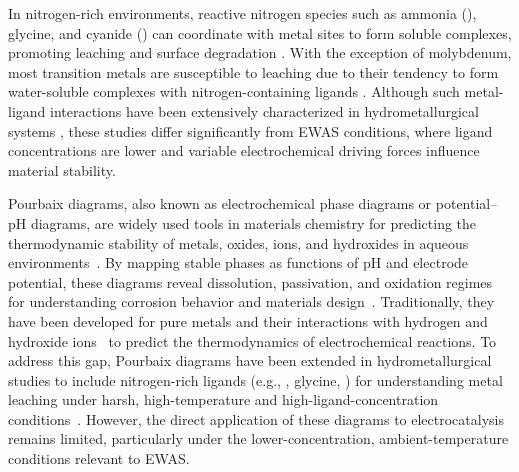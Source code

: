 \documentclass[journal=jacsat,manuscript=article]{achemso}
\begin{document}
In nitrogen-rich environments, reactive nitrogen species such as ammonia (), glycine, and cyanide () can coordinate with metal sites to form soluble complexes, promoting leaching and surface degradation \cite{Bjerrum1957StabilitySubstances, Meng1996PrinciplesReview, Wang2022AmmoniaSystem}. With the exception of molybdenum, most transition metals are susceptible to leaching due to their tendency to form water-soluble complexes with nitrogen-containing ligands \cite{Meng1996PrinciplesReview, Ma2021ALeaching, Wang2020Reduction-ammoniacalSalts, Li2025Glycine-mediatedStudy}. Although such metal-ligand interactions have been extensively characterized in hydrometallurgical systems \cite{Han1974AMMONIA-AMMONIUMNODULES, Bhuntumkomol1982TheSolutions, Azadi2021SustainableGlycine, Oraby2020GoldPermanganate, Sarvar2023ApplicationStructure, SPARROW1995CyanideApplications, Akcil2015PreciousReview, Wang2022AmmoniaSystem, Ma2021ALeaching, Wang2020Reduction-ammoniacalSalts, Li2025Glycine-mediatedStudy}, these studies differ significantly from EWAS conditions, where ligand concentrations are lower and variable electrochemical driving forces influence material stability.


Pourbaix diagrams, also known as electrochemical phase diagrams or potential–pH diagrams, are widely used tools in materials chemistry for predicting the thermodynamic stability of metals, oxides, ions, and hydroxides in aqueous environments~\cite{PourbaixAtlasSolutions, Huang2015ElectrochemicalCalculations, McCafferty2010ThermodynamicsDiagrams}. By mapping stable phases as functions of pH and electrode potential, these diagrams reveal dissolution, passivation, and oxidation regimes for understanding corrosion behavior and materials design~\cite{Stack2005BridgingDiagrams, Pourbaix1973LecturesCorrosion, Fontana1987CorrosionCompany}. Traditionally, they have been developed for pure metals and their interactions with hydrogen and hydroxide ions~\cite{Huang2017ImprovedCompounds, Wang2020PredictingFunctional, Cao2020E-pHLaterite} to predict the thermodynamics of electrochemical reactions. To address this gap, Pourbaix diagrams have been extended in hydrometallurgical studies to include nitrogen-rich ligands (e.g., , glycine, ) for understanding metal leaching under harsh, high-temperature and high-ligand-concentration conditions~\cite{Meng1996PrinciplesReview, NasuhaYahya2019ThermodynamicDiagram, Barragan2021LeachingOptimization, OConnor2018ElectrochemicalSolutions, Seke2006EffectSphalerite}. However, the direct application of these diagrams to electrocatalysis remains limited, particularly under the lower-concentration, ambient-temperature conditions relevant to EWAS.
\end{document}
